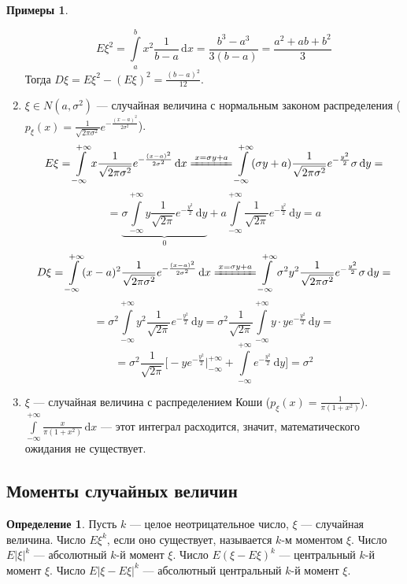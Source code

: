 \documentclass[11pt,openany,a4paper]{scrartcl}
\theoremstyle{plain}
\theoremstyle{definition}
\newtheorem{definition}[theorem]{Определение}
\newtheorem{examples}[theorem]{Примеры}
\newcommand{\undereq}[1]{\xlongequal{#1}}
\newcommand{\dif}{\, \mathrm d}
\begin{document}
\begin{examples}
\begin{enumerate}
        $$
        E\xi^2 =
        \int\limits_a^b x^2\frac{1}{b-a}\dif x = \frac{b^3 - a^3}{3(b-a)} =
        \frac{a^2 + ab + b^2}{3}
        $$
        Тогда $D\xi = E\xi^2 - (E\xi)^2 = \frac{(b-a)^2}{12}$.
        \item $\xi \in N(a, \sigma^2)$ — случайная величина с нормальным
        законом распределения ($p_\xi(x) =
        \frac{1}{\sqrt{2\pi\sigma^2}}e^{-\frac{(x-a)^2}{2\sigma^2}}$).
        $$
        E\xi = \int\limits_{-\infty}^{+\infty}x\frac{1}{\sqrt{2\pi\sigma^2}}
        e^{-\frac{(x-a)^2}{2\sigma^2}}\dif x \undereq{x = \sigma y + a}
        \int\limits_{-\infty}^{+\infty}
        (\sigma y + a)\frac{1}{\sqrt{2\pi\sigma^2}}
        e^{-\frac{y^2}{2}}\sigma\dif y =
        $$
        $$
        =\underbrace{\sigma \int\limits_{-\infty}^{+\infty}
        y\frac{1}{\sqrt{2\pi}}e^{-\frac{y^2}{2}} \dif y}_0 +
        a\int\limits_{-\infty}^{+\infty}
        \frac{1}{\sqrt{2\pi}}e^{-\frac{y^2}{2}} \dif y = a
        $$
        $$
        D\xi = \int\limits_{-\infty}^{+\infty}
        (x-a)^2\frac{1}{\sqrt{2\pi\sigma^2}}e^{-\frac{(x-a)^2}{2\sigma^2}} \dif x
        \undereq{x = \sigma y + a} \int\limits_{-\infty}^{+\infty}
        \sigma^2 y^2 \frac{1}{\sqrt{2\pi\sigma^2}}e^{-\frac{y^2}{2}}\sigma \dif y =
        $$
        $$
        =\sigma^2 \int\limits_{-\infty}^{+\infty}
        y^2 \frac{1}{\sqrt{2\pi}}e^{-\frac{y^2}{2}}\dif y
        = \sigma^2 \frac{1}{\sqrt{2\pi}} \int\limits_{-\infty}^{+\infty}
        y\cdot ye^{-\frac{y^2}{2}}\dif y =
        $$
        $$
        = \sigma^2 \frac{1}{\sqrt{2\pi}}
        \bigg[ -ye^{-\frac{y^2}{2}}\bigg|_{-\infty}^{+\infty} +
        \int\limits_{-\infty}^{+\infty}e^{-\frac{y^2}{2}}\dif y\bigg] = \sigma^2
        $$
        \item $\xi$ — случайная величина с распределением Коши
        ($p_\xi(x) = \frac{1}{\pi(1 + x^2)}$).
        $\int\limits_{-\infty}^{+\infty} \frac{x}{\pi(1 + x^2)}\dif x$ — этот 
        интеграл расходится, значит, математического ожидания не существует.
    \end{enumerate}
\end{examples}

\subsection{Моменты случайных величин}

\begin{definition}
    Пусть $k$ — целое неотрицательное число, $\xi$ — случайная величина.
    Число $E\xi^k$, если оно существует, называется $k$-м моментом $\xi$.
    Число $E|\xi|^k$ — абсолютный $k$-й момент $\xi$.
    Число $E(\xi - E\xi)^k$ — центральный $k$-й момент $\xi$.
    Число $E|\xi - E\xi|^k$ — абсолютный центральный $k$-й момент $\xi$.
\end{definition}
\end{document}
